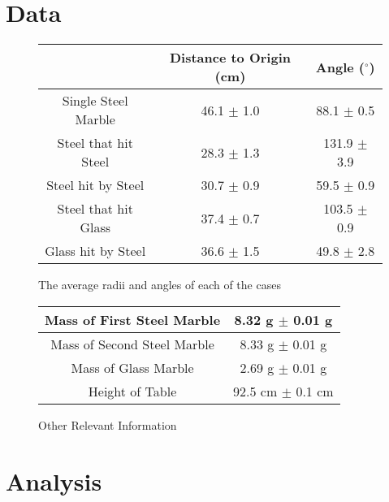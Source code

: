 \documentclass[11pt]{article}
\begin{document}
\section{Data}
\begin{figure}[h]
\begin{center}
\caption{The average radii and angles of each of the cases}
\begin{tabular}{|c|c|c|}
	\hline 
	& Distance to Origin (cm) & Angle (\({}^\circ\))  \\ 
	\hline 
	Single Steel Marble & 46.1 \(\pm\) 1.0  &  88.1 \(\pm\) 0.5\\ 
	\hline 
	Steel that hit Steel & 28.3 \(\pm\)   1.3 & 131.9 \(\pm\) 3.9 \\ 
	\hline 
	Steel hit by Steel & 30.7 \(\pm\) 0.9 & 59.5 \(\pm\) 0.9 \\ 
	\hline 
	Steel that hit Glass & 37.4 \(\pm\) 0.7 & 103.5 \(\pm\) 0.9 \\ 
	\hline 
	Glass hit by Steel & 36.6 \(\pm\) 1.5 & 49.8 \(\pm\) 2.8 \\ 
	\hline 
\end{tabular}
\end{center}
\end{figure}
\begin{figure}[h]
	\begin{center}
		\caption{Other Relevant Information}
		\begin{tabular}{|c|c|}
			\hline
			Mass of First Steel Marble & 8.32 g \(\pm\) 0.01 g \\ 
			\hline 
			Mass of Second Steel Marble & 8.33 g \(\pm\) 0.01 g \\ 
			\hline 
			Mass of Glass Marble & 2.69 g \(\pm\) 0.01 g \\ 
			\hline 
			Height of Table & 92.5 cm \(\pm\) 0.1 cm \\ 
			\hline 
		\end{tabular}
	\end{center}
\end{figure}
\section{Analysis}
\end{document}
